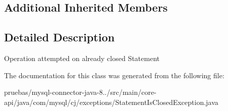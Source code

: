 \subsection*{Additional Inherited Members}


\subsection{Detailed Description}
Operation attempted on already closed Statement 

The documentation for this class was generated from the following file\+:\begin{DoxyCompactItemize}
\item 
pruebas/mysql-\/connector-\/java-\/8../src/main/core-\/api/java/com/mysql/cj/exceptions/Statement\+Is\+Closed\+Exception.\+java\end{DoxyCompactItemize}
